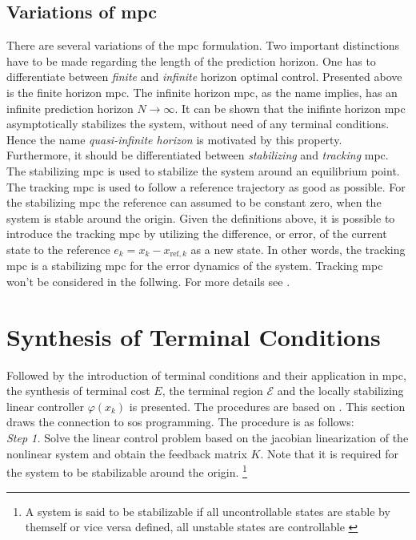 \documentclass[10pt,a4paper,titlepage]{article}
\begin{document}
\subsection{Variations of \gls{mpc}}
There are several variations of the \gls{mpc} formulation. Two important distinctions have to be made regarding the length
of the prediction horizon. One has to differentiate between \textit{finite} and \textit{infinite} horizon optimal control. Presented
above is the finite horizon \gls{mpc}. The infinite horizon \gls{mpc}, as the name implies, has an infinite prediction horizon
$N \rightarrow \infty$. It can be shown that the inifinte horizon \gls{mpc} asymptotically stabilizes the system, without need
of any terminal conditions. Hence the name \textit{quasi-infinite horizon} is motivated by this property.
Furthermore, it should be differentiated between \textit{stabilizing} and \textit{tracking} \gls{mpc}. The stabilizing \gls{mpc}
is used to stabilize the system around an equilibrium point. The tracking \gls{mpc} is used to follow
a reference trajectory as good as possible. For the stabilizing \gls{mpc} the reference can assumed to be constant zero, when the 
system is stable around the origin. Given the definitions above, it is possible to introduce the tracking \gls{mpc} by utilizing
the difference, or error, of the current state to the reference $e_k = x_k - x_{\text{ref},k}$ as a new state. In other words,
the tracking \gls{mpc} is a stabilizing \gls{mpc} for the error dynamics of the system. Tracking \gls{mpc} won't be considered in
the follwing. For more details see \cite{nmpcBible}. 










\section{Synthesis of Terminal Conditions}
\label{sec:synTermCond}
Followed by the introduction of terminal conditions and their application in \gls{mpc}, the synthesis of terminal cost $E$, the
terminal region $\mathcal{E}$ and the locally stabilizing linear controller $\varphi(x_{k})$ is presented. The procedures are based
on \cite{CHEN19981205}. This section draws the connection to \gls{sos} programming. The procedure is as follows:\\

\textit{Step 1.} Solve the linear control problem based on the jacobian linearization of the nonlinear system and obtain the feedback
matrix $K$. Note that it is required for the system to be stabilizable around the origin. \footnote{A system is said to be stabilizable if
all uncontrollable states are stable by themself or vice versa defined, all unstable states are controllable \cite{lunze2016regelungstechnik}}\\
\end{document}
